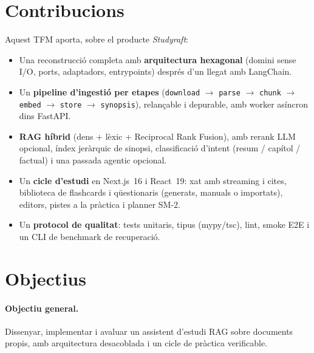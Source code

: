 \section{Contribucions}

Aquest TFM aporta, sobre el producte \emph{Studyraft}:

\begin{itemize}
  \item Una reconstrucció completa amb \textbf{arquitectura hexagonal} (domini sense I/O, ports, adaptadors, entrypoints) després d'un llegat amb LangChain.
  \item Un \textbf{pipeline d'ingestió per etapes} (\texttt{download} $\rightarrow$ \texttt{parse} $\rightarrow$ \texttt{chunk} $\rightarrow$ \texttt{embed} $\rightarrow$ \texttt{store} $\rightarrow$ \texttt{synopsis}), relançable i depurable, amb worker asíncron dins FastAPI.
  \item \textbf{RAG híbrid} (dens + lèxic + Reciprocal Rank Fusion), amb rerank LLM opcional, índex jeràrquic de sinopsi, classificació d'intent (resum / capítol / factual) i una passada agentic opcional.
  \item Un \textbf{cicle d'estudi} en Next.js~16 i React~19: xat amb streaming i cites, biblioteca de flashcards i qüestionaris (generats, manuals o importats), editors, pistes a la pràctica i planner SM-2.
  \item Un \textbf{protocol de qualitat}: tests unitaris, tipus (mypy/tsc), lint, smoke E2E i un CLI de benchmark de recuperació.
\end{itemize}

\section{Objectius}

\paragraph{Objectiu general.}
Dissenyar, implementar i avaluar un assistent d'estudi RAG sobre documents propis, amb arquitectura desacoblada i un cicle de pràctica verificable.

